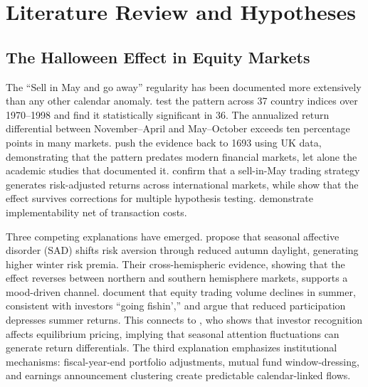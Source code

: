 \documentclass[12pt,a4paper]{article}
\begin{document}

\section{Literature Review and Hypotheses}\label{sec:litreview}

\subsection{The Halloween Effect in Equity Markets}

The ``Sell in May and go away'' regularity has been documented more extensively than any other calendar anomaly. \citet{BoumanJacobsen2002} test the pattern across 37 country indices over 1970--1998 and find it statistically significant in 36. The annualized return differential between November--April and May--October exceeds ten percentage points in many markets. \citet{JacobsenZhang2013} push the evidence back to 1693 using UK data, demonstrating that the pattern predates modern financial markets, let alone the academic studies that documented it. \citet{AndradeChhaochhariaFuerst2013} confirm that a sell-in-May trading strategy generates risk-adjusted returns across international markets, while \citet{HaggardWitte2010} show that the effect survives corrections for multiple hypothesis testing. \citet{DichtlDrobetz2014} demonstrate implementability net of transaction costs.

Three competing explanations have emerged. \citet{KamstraKramerLevi2003} propose that seasonal affective disorder (SAD) shifts risk aversion through reduced autumn daylight, generating higher winter risk premia. Their cross-hemispheric evidence, showing that the effect reverses between northern and southern hemisphere markets, supports a mood-driven channel. \citet{HongYu2009} document that equity trading volume declines in summer, consistent with investors ``going fishin','' and argue that reduced participation depresses summer returns. This connects to \citet{Merton1987}, who shows that investor recognition affects equilibrium pricing, implying that seasonal attention fluctuations can generate return differentials. The third explanation emphasizes institutional mechanisms: fiscal-year-end portfolio adjustments, mutual fund window-dressing, and earnings announcement clustering create predictable calendar-linked flows.
\end{document}
